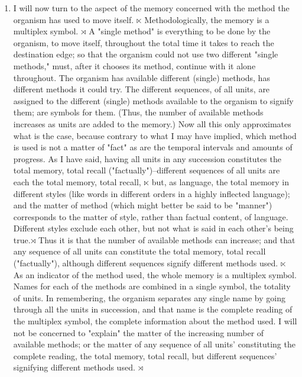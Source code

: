 \documentclass[10pt,twoside]{memoir}
\begin{document}
\begin{enumerate}
{\begin{enumerate}
\begin{sysrules}
\begin{sysrules}
\begin{sysrules}
\begin{sysrules}
{\begin{enumerate}
\begin{enumerate}
\item I will now turn to the aspect of the memory concerned with the 
method the organism has used to move itself. $\ltimes$ Methodologically, the 
memory is a multiplex symbol. $\rtimes$ A "single method" is everything to be done 
by the organism, to move itself, throughout the total time it takes to reach 
the destination edge; so that the organism could not use two different 
"single methods," must, after it chooses its method, continue with it alone 
throughout. The organism has available different (single) methods, has 
different methods it could try. The different sequences, of all units, are 
assigned to the different (single) methods available to the organism to signify 
them; are symbols for them. (Thus, the number of available methods 
increases as units are added to the memory.) Now all this only approximates 
what is the case, because contrary to what I may have implied, which 
method is used is not a matter of "fact" as are the temporal intervals and 
amounts of progress. As I have said, having all units in any succession 
constitutes the total memory, total recall ("factually")--different sequences 
of all units are each the total memory, total recall, $\ltimes$ but, as language, the 
total memory in different styles (like words in different orders in a highly 
inflected language); and the matter of method (which might better be said to 
be "manner") corresponds to the matter of style, rather than factual 
content, of language. Different styles exclude each other, but not what is 
said in each other's being true.$\rtimes$ Thus it is that the number of available 
methods can increase; and that any sequence of all units can constitute the 
total memory, total recall ("factually"), although different sequences signify 
different methods used. $\ltimes$ As an indicator of the method used, the whole 
memory is a multiplex symbol. Names for each of the methods are combined 
in a single symbol, the totality of units. In remembering, the organism 
separates any single name by going through all the units in succession, and 
that name is the complete reading of the multiplex symbol, the complete 
information about the method used. I will not be concerned to "explain" 
the matter of the increasing number of available methods; or the matter of 
any sequence of all units' constituting the complete reading, the total 
memory, total recall, but different sequences' signifying different methods 
used. $\rtimes$


\end{enumerate}
\end{enumerate}}
\end{sysrules}
\end{sysrules}
\end{sysrules}
\end{sysrules}
\end{enumerate}}
\end{enumerate}
\end{document}
